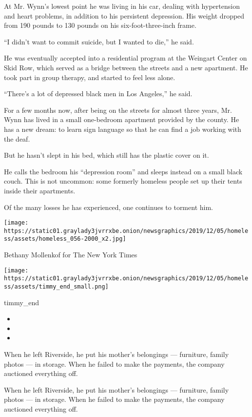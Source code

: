 At Mr. Wynn's lowest point he was living in his car, dealing with
hypertension and heart problems, in addition to his persistent
depression. His weight dropped from 190 pounds to 130 pounds on his
six-foot-three-inch frame.

``I didn't want to commit suicide, but I wanted to die,'' he said.

He was eventually accepted into a residential program at the Weingart
Center on Skid Row, which served as a bridge between the streets and a
new apartment. He took part in group therapy, and started to feel less
alone.

``There's a lot of depressed black men in Los Angeles,'' he said.

For a few months now, after being on the streets for almost three years,
Mr. Wynn has lived in a small one-bedroom apartment provided by the
county. He has a new dream: to learn sign language so that he can find a
job working with the deaf.

But he hasn't slept in his bed, which still has the plastic cover on it.

He calls the bedroom his ``depression room'' and sleeps instead on a
small black couch. This is not uncommon: some formerly homeless people
set up their tents inside their apartments.

Of the many losses he has experienced, one continues to torment him.

\texttt{[image: https://static01.graylady3jvrrxbe.onion/newsgraphics/2019/12/05/homeless/assets/homeless\_056-2000\_x2.jpg]}

Bethany Mollenkof for The New York Times

\texttt{[image: https://static01.graylady3jvrrxbe.onion/newsgraphics/2019/12/05/homeless/assets/timmy\_end\_small.png]}

timmy\_end

\begin{itemize}
\item
\item
\item
\end{itemize}

 When he left Riverside, he put his mother's belongings --- furniture,
family photos --- in storage. When he failed to make the payments, the
company auctioned everything off.

 When he left Riverside, he put his mother's belongings --- furniture,
family photos --- in storage. When he failed to make the payments, the
company auctioned everything off.

